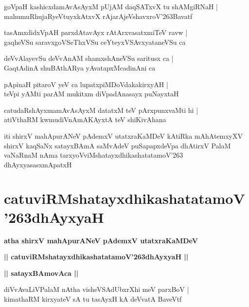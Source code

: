 \documentclass[twoside,12pt,openright]{book}
\def\S{\char'263}
\newcounter{shloka}[chapter]
\def\uvaca#1{\centerline{{\large\textbf{#1}}}}
\begin{document}
\begin{shloka}%
goVpaH kashicxdamAvAsAyxM pUjAM daqSATxvX tu shAMgiRNaH |\\
mahumuRhujaRyeVtuyxkAtxvX rAjarAjeVshavxroV\S Bavatf
\end{shloka}

\begin{shloka}%
tasAmxdidxVpAH parxdAtavAyx rAtArxvasatxmiTeV ravw |\\
gaqheVSu saravxgoVSeThxVSu ceYteyxVSAvxyataneVSu ca 
\end{shloka}

\begin{shloka}%
deVvAlayevSu deVvAnAM shamxshAneVSu saritusx ca |\\
GaqtAdinA shuBAthARya yAvatapxMcadinAni ca 
\end{shloka}

\begin{shloka}%
pApinaH pitaroV yeV ca lupatxpiMDoVdakakirxyAH |\\
teVpi yAMti parAM mukitxm diVpadAnasayx puNayxtaH 
\end{shloka}

\begin{shloka}%
catudaRshAyxmamAvAsAyxM datatxM teV pArxpunxvaMti hi |\\
atiVthaRM kwmudiVnAmAKAyxtA teV shiKivAhana
\end{shloka}

\begin{center}
iti shirxV mahApurANeV pAdemxV utatxraKaMDeV kAtiRka mAhAtemxyXV shirxV kaqSaNx satayxBAmA 
saMvAdeV puSapapxdeVpa dhAtirxV PalaM vaNaRnaM nAma tarxyoVviMshatayxdhikashatatamoV\S 
dhAyxyasasxmApatxH 
\end{center}

\chapter{catuviRMshatayxdhikashatatamoV\S dhAyxyaH}

\begin{center}
{\LARGE\bfseries atha shirxV mahApurANeV pAdemxV utatxraKaMDeV}
\end{center}

\begin{center}
{\LARGE\bfseries || catuviRMshatayxdhikashatatamoV\S dhAyxyaH || }
\end{center}

\uvaca{|| satayxBAmovAca ||}

\begin{shloka}%
diVvAvaLiVPalaM nAtha visheVSAdUbxrXhi meV parxBoV |\\
kimathaRM kirxyateV sA tu tasAyxH kA deVvatA BaveVtf
\end{shloka}
\end{document}

